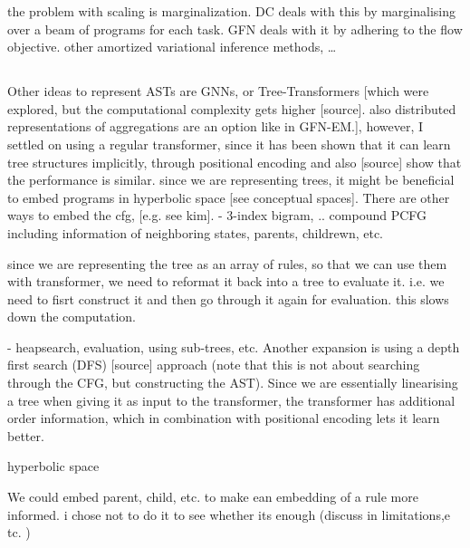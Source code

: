 the problem with scaling is marginalization. DC deals with this by marginalising over a beam of programs for each task. GFN deals with it by adhering to the flow objective. 
other amortized variational inference methods, \dots






















\subsection{}
Other ideas to represent ASTs are GNNs, or Tree-Transformers [which were explored, but the computational complexity gets higher [source]. also distributed representations of aggregations are an option like in GFN-EM.], however, I settled on using a regular transformer, since it has been shown that it can learn tree structures implicitly, through positional encoding and also [source] show that the performance is similar.
since we are representing trees, it might be beneficial to embed programs in hyperbolic space [see conceptual spaces]. 
There are other ways to embed the cfg, [e.g. see kim].
- 3-index bigram, .. compound PCFG including information of neighboring states, parents, childrewn, etc. 



since we are representing the tree as an array of rules, so that we can use them with transformer, we need to reformat it back into a tree to evaluate it. i.e. we need to fisrt construct it and then go through it again for evaluation. this slows down the computation. 


- heapsearch, evaluation, using sub-trees, etc. 
Another expansion is using a depth first search (DFS) [source] approach (note that this is not about searching through the CFG, but constructing the AST). Since we are essentially linearising a tree when giving it as input to the transformer, the transformer has additional order information, which in combination with positional encoding lets it learn better. 

hyperbolic space



We could embed parent, child, etc. to make ean embedding of a rule more informed. i chose not to do it to see whether its enough (discuss in limitations,e tc. )

